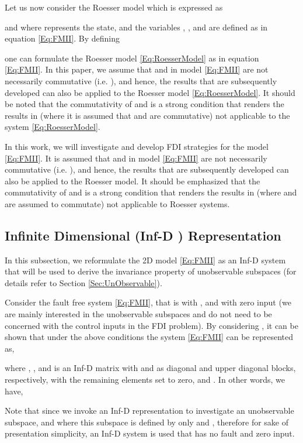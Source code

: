 \documentclass[journal,12pt,draftcls,onecolumn]{IEEEtran}
\newcommand{\infd}{Inf-D }
\begin{document}
Let us now consider the Roesser model \cite{Roess} which is expressed as

and where  represents the state, and the variables , ,  and  are defined as in equation \eqref{Eq:FMII}. By defining

one can formulate the Roesser model \eqref{Eq:RoesserModel} as in equation \eqref{Eq:FMII}. In this paper, we assume that  and  in model \eqref{Eq:FMII} are not necessarily commutative (i.e. ), and hence, the results that are subsequently developed  can also be applied to the Roesser model \eqref{Eq:RoesserModel}. It should be noted that the commutativity of   and  is a strong condition that renders the results in\cite{Valcher2013} (where it is assumed that  and  are commutative) not applicable to the system \eqref{Eq:RoesserModel}.

In this work, we will investigate and develop FDI strategies for the model \eqref{Eq:FMII}. It is assumed that  and  in model \eqref{Eq:FMII} are not necessarily commutative (i.e. ), and hence, the results that are subsequently developed  can also be applied to the Roesser model. It should be emphasized that the commutativity of   and  is a strong condition that renders the results in\cite{Valcher2013} (where   and  are assumed to commutate) not applicable to Roesser systems.

\subsection{Infinite Dimensional (\infd) Representation} \label{Sec:IDRep}
In this subsection, we reformulate the 2D model \eqref{Eq:FMII} as an Inf-D system that will be used to derive the invariance property of  unobservable subspaces (for details refer to Section \ref{Sec:UnObservable}).

Consider the fault free system \eqref{Eq:FMII}, that is with , and with zero input (we are mainly interested in the unobservable subspaces and do not need to be concerned with the control inputs in the FDI problem). By considering  , it can be shown that under the above conditions the system \eqref{Eq:FMII} can be represented as,

where , , and  is an Inf-D matrix with  and  as diagonal and upper diagonal blocks, respectively, with the remaining elements set to zero, and . In other words, we have,



Note that since we invoke an Inf-D representation to investigate an unobservable subspace, and where this subspace is defined by only  and , therefore for sake of  presentation simplicity,  an Inf-D system is used that has no fault and zero input. 
\end{document}
